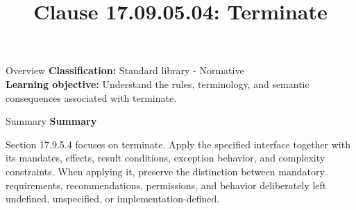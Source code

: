 \documentclass[10pt,letterpaper]{article}
\title{Clause 17.09.05.04: Terminate}
\author{}
\date{}
\begin{document}
\maketitle
\begin{CornellOverviewBox}{Overview}
\textbf{Classification:} Standard library - Normative\\[2pt]
\textbf{Learning objective:} Understand the rules, terminology, and semantic consequences associated with terminate.
\end{CornellOverviewBox}\begin{CornellSummaryBox}{Summary}
{\sffamily\bfseries\color{Accent} Summary}\par\vspace{3pt}Section 17.9.5.4 focuses on terminate. Apply the specified interface together with its mandates, effects, result conditions, exception behavior, and complexity constraints. When applying it, preserve the distinction between mandatory requirements, recommendations, permissions, and behavior deliberately left undefined, unspecified, or implementation-defined.
\end{CornellSummaryBox}
\end{document}
